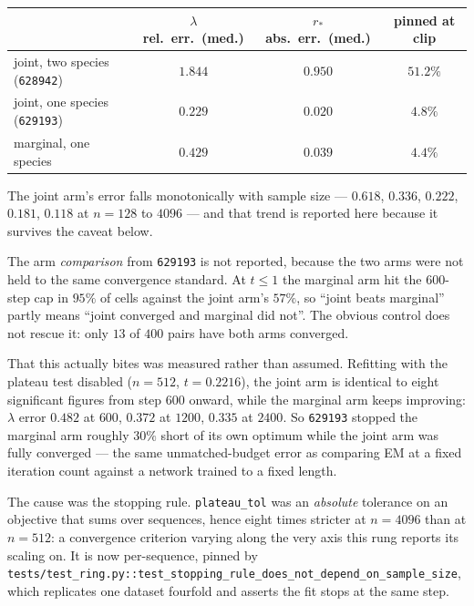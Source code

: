 \begin{center}\small
\begin{tabular}{lccc}
\toprule
 & $\lambda$ rel.\ err.\ (med.) & $r_*$ abs.\ err.\ (med.) & pinned at clip \\
\midrule
joint, two species (\texttt{628942}) & $1.844$ & $0.950$ & $51.2\%$ \\
joint, one species (\texttt{629193}) & $0.229$ & $0.020$ & $4.8\%$ \\
marginal, one species                & $0.429$ & $0.039$ & $4.4\%$ \\
\bottomrule
\end{tabular}
\end{center}

\noindent The joint arm's error falls monotonically with sample size --- $0.618$, $0.336$, $0.222$,
$0.181$, $0.118$ at $n = 128$ to $4096$ --- and that trend is reported here because it survives the
caveat below.

\begin{pitfall}
The arm \emph{comparison} from \texttt{629193} is not reported, because the two arms were not held to
the same convergence standard. At $t\le1$ the marginal arm hit the $600$-step cap in $95\%$ of cells
against the joint arm's $57\%$, so ``joint beats marginal'' partly means ``joint converged and
marginal did not''. The obvious control does not rescue it: only $13$ of $400$ pairs have both arms
converged.

That this actually bites was measured rather than assumed. Refitting with the plateau test disabled
($n{=}512$, $t{=}0.2216$), the joint arm is identical to eight significant figures from step $600$
onward, while the marginal arm keeps improving: $\lambda$ error $0.482$ at $600$, $0.372$ at $1200$,
$0.335$ at $2400$. So \texttt{629193} stopped the marginal arm roughly $30\%$ short of its own
optimum while the joint arm was fully converged --- the same unmatched-budget error as comparing EM
at a fixed iteration count against a network trained to a fixed length.

The cause was the stopping rule. \texttt{plateau\_tol} was an \emph{absolute} tolerance on an
objective that sums over sequences, hence eight times stricter at $n{=}4096$ than at $n{=}512$: a
convergence criterion varying along the very axis this rung reports its scaling on. It is now
per-sequence, pinned by
\texttt{tests/test\_ring.py::test\_stopping\_rule\_does\_not\_depend\_on\_sample\_size}, which
replicates one dataset fourfold and asserts the fit stops at the same step.
\end{pitfall}

